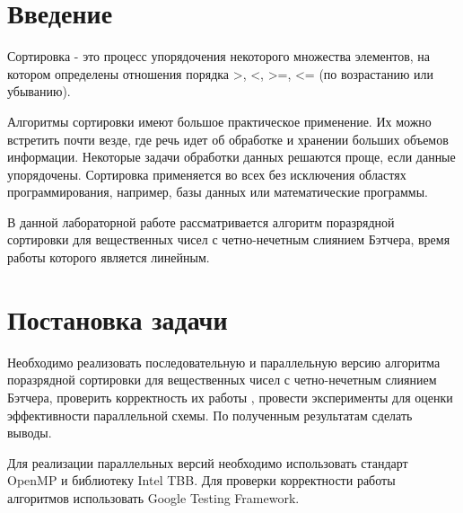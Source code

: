 \documentclass{report}
\begin{document}
\setcounter{page}{2}

\tableofcontents
\newpage

\section*{Введение}
Сортировка - это процесс упорядочения некоторого множества элементов, на котором определены отношения порядка >, <, >=, <= (по возрастанию
или убыванию).
\par Алгоритмы сортировки имеют большое практическое применение. Их
можно встретить почти везде, где речь идет об обработке и хранении больших
объемов информации. Некоторые задачи обработки данных решаются проще,
если данные упорядочены. Сортировка применяется во всех без исключения областях программирования, например, базы данных или математические программы.
\par В данной лабораторной работе рассматривается алгоритм поразрядной сортировки для вещественных чисел с четно-нечетным слиянием Бэтчера, время работы которого является линейным.
\newpage

\section*{Постановка задачи}
Необходимо реализовать последовательную и параллельную версию алгоритма поразрядной сортировки для вещественных чисел с четно-нечетным слиянием Бэтчера, проверить корректность их работы , провести эксперименты для оценки эффективности параллельной схемы. По полученным результатам сделать выводы.
\par Для реализации параллельных версий необходимо использовать стандарт OpenMP и библиотеку Intel TBB. Для проверки корректности работы алгоритмов использовать Google Testing Framework.
\newpage

\end{document}

